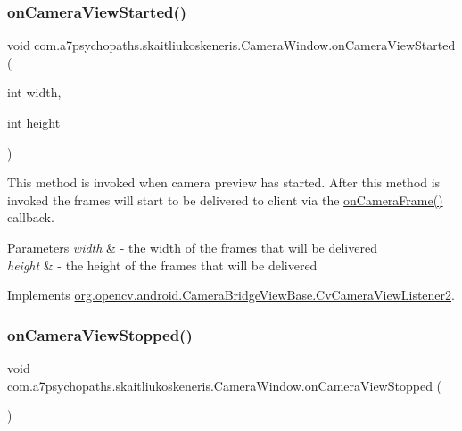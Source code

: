 \subsubsection{\texorpdfstring{on\+Camera\+View\+Started()}{onCameraViewStarted()}}
{\footnotesize\ttfamily void com.\+a7psychopaths.\+skaitliukoskeneris.\+Camera\+Window.\+on\+Camera\+View\+Started (\begin{DoxyParamCaption}\item[{int}]{width,  }\item[{int}]{height }\end{DoxyParamCaption})}

This method is invoked when camera preview has started. After this method is invoked the frames will start to be delivered to client via the \mbox{\hyperlink{classcom_1_1a7psychopaths_1_1skaitliukoskeneris_1_1_camera_window_a2ee3840e4c61b7ab95e2dc3f6407aad0}{on\+Camera\+Frame()}} callback. 
\begin{DoxyParams}{Parameters}
{\em width} & -\/ the width of the frames that will be delivered \\
\hline
{\em height} & -\/ the height of the frames that will be delivered \\
\hline
\end{DoxyParams}


Implements \mbox{\hyperlink{interfaceorg_1_1opencv_1_1android_1_1_camera_bridge_view_base_1_1_cv_camera_view_listener2_a8229eca0048f11f06e2cd798c10a1b4d}{org.\+opencv.\+android.\+Camera\+Bridge\+View\+Base.\+Cv\+Camera\+View\+Listener2}}.

\mbox{\label{classcom_1_1a7psychopaths_1_1skaitliukoskeneris_1_1_camera_window_a17537fd517c83369e27b6ff3f26b38e7}} 
\subsubsection{\texorpdfstring{on\+Camera\+View\+Stopped()}{onCameraViewStopped()}}
{\footnotesize\ttfamily void com.\+a7psychopaths.\+skaitliukoskeneris.\+Camera\+Window.\+on\+Camera\+View\+Stopped (\begin{DoxyParamCaption}{ }\end{DoxyParamCaption})}

